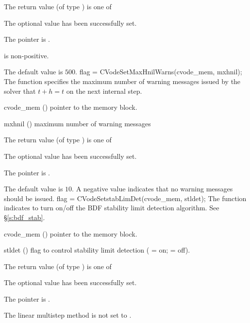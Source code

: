 {
  The return value  (of type ) is one of
  \begin{args}
  \item[\Id{SUCCESS}] 
    The optional value has been successfully set.
  \item[\Id{CVS\_NO\_MEM}]
    The  pointer is .
  \item[\Id{CVS\_ILL\_INPUT}]
     is non-positive.
  \end{args}
}
{
  The default value is $500$.
}
{
flag = CVodeSetMaxHnilWarns(cvode\_mem, mxhnil);
}
{
  The function  specifies the maximum number of warning messages
  issued by the solver that $t+h=t$ on the next internal step.
}
{
  \begin{args}
  \item[cvode\_mem] ()
    pointer to the {\cvode} memory block.
  \item[mxhnil] ()
    maximum number of warning messages
  \end{args}
}
{
  The return value  (of type ) is one of
  \begin{args}
  \item[\Id{SUCCESS}] 
    The optional value has been successfully set.
  \item[\Id{CVS\_NO\_MEM}]
    The  pointer is .
  \end{args}
}
{
  The default value is $10$.
  A negative  value indicates that no warning messages should
  be issued.
}
{
flag = CVodeSetstabLimDet(cvode\_mem, stldet);
}
{
  The function  indicates to turn on/off
  the BDF stability limit detection algorithm. See \S\ref{s:bdf_stab}.
}
{
  \begin{args}
  \item[cvode\_mem] ()
    pointer to the {\cvode} memory block.
  \item[stldet] ()
    flag to control stability limit detection ( = on;  = off).
  \end{args}
}
{
  The return value  (of type ) is one of
  \begin{args}
  \item[\Id{SUCCESS}] 
    The optional value has been successfully set.
  \item[\Id{CVS\_NO\_MEM}]
    The  pointer is .
  \item[\Id{CVS\_ILL\_INPUT}]
    The linear multistep method is not set to .
  \end{args}
}

